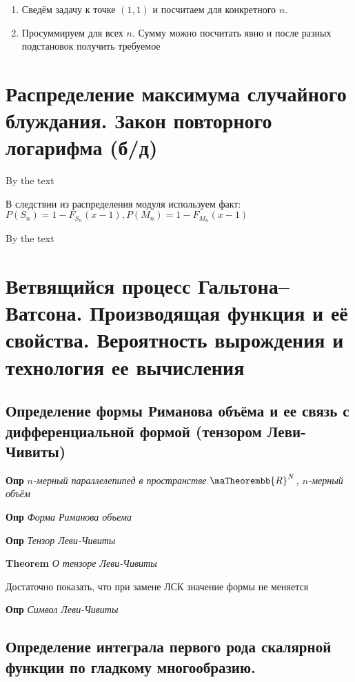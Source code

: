 \documentclass[a4paper, 14pt]{article}
\begin{document}
    \begin{enumerate}
        \item Сведём задачу к точке $(1,1)$ и посчитаем для конкретного $n$.
        \item Просуммируем для всех $n$.
        Сумму можно посчитать явно и после разных подстановок получить требуемое
    \end{enumerate}
    
    \section{Распределение максимума случайного блуждания. Закон повторного логарифма (б/д)}
    
    By the text
    
    В следствии из распределения модуля используем факт: $P(S_n) = 1 - F_{S_n}(x-1), P(M_n) = 1 - F_{M_n}(x-1)$
    
    By the text
    
    \section{Ветвящийся процесс Гальтона–Ватсона.
    Производящая функция и её свойства.
    Вероятность вырождения и технология ее вычисления}
    
    \subsection{Определение формы Риманова объёма и ее связь с дифференциальной формой (тензором Леви-Чивиты)}
    
    \textbf{Опр} \textit{$n$-мерный параллелепипед в пространстве $\maTheorembb{R}^N$, $n$-мерный объём}
    
    \textbf{Опр} \textit{Форма Риманова объема}
    
    \textbf{Опр} \textit{Тензор Леви-Чивиты}
    
    \textbf{Theorem} \textit{О тензоре Леви-Чивиты}
    
    Достаточно показать, что при замене ЛСК значение формы не меняется
    
    \textbf{Опр} \textit{Символ Леви-Чивиты}
    
    \subsection{Определение интеграла первого рода скалярной функции по гладкому многообразию.}
    
\end{document}
